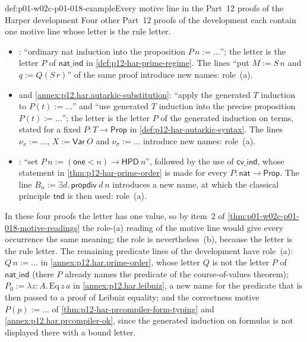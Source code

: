 \begin{hbexample}{def:p01-w02c-p01-018-example}{Every motive line in the Part~12 proofs of the Harper development}
Four other Part~12 proofs of the development each contain one motive line
whose letter is the rule letter.
\begin{itemize}
  \item {}: ``ordinary nat
  induction into the proposition \(P\,n:=\ldots\)''; the letter is the
  letter \(P\) of \(\mathsf{nat\_ind}\) in
  \cref{def:p12-har-prime-regime}.  The lines ``put \(M:=S\,n\) and
  \(q:=Q(S\,r)\)'' of the same proof introduce new names: role~(a).
  \item {} and
  \cref{annex:p12.har.autarkic-substitution}: ``apply the generated
  \(T\) induction to \(P(t):=\ldots\)'' and ``use generated \(T\)
  induction into the precise proposition \(P(t):=\ldots\)''; the letter is
  the letter \(P\) of the generated induction on terms, stated for a fixed
  \(P:T\to\mathsf{Prop}\) in \cref{def:p12-har-autarkic-syntax}.
  The lines \(\nu_x:=\ldots\), \(X:=\mathsf{Var}\ O\) and
  \(\nu_\sigma:=\ldots\) introduce new names: role~(a).
  \item {}: ``set
  \(P\,n:=(\mathsf{one}<n)\to\mathsf{HPD}\ n\)'', followed by the use of
  \(\mathsf{cv\_ind}\), whose statement in
  \cref{thm:p12-har-prime-order} is made for every
  \(P:\mathsf{nat}\to\mathsf{Prop}\).  The line
  \(B_n:=\exists d.\,\mathsf{propdiv}\ d\ n\) introduces a new name, at
  which the classical principle \(\mathsf{tnd}\) is then used: role~(a).
\end{itemize}
In these four proofs the letter has one value, so by item~2 of
\cref{thm:p01-w02c-p01-018-motive-readings} the role-(a) reading of the
motive line would give every occurrence the same meaning; the role is
nevertheless~(b), because the letter is the rule letter.  The remaining
predicate lines of the development have role~(a): \(Q\,n:=\ldots\) in
\cref{annex:p12.har.prime-order}, whose letter \(Q\) is not the letter
\(P\) of \(\mathsf{nat\_ind}\) (there \(P\) already names the predicate of
the course-of-values theorem); \(P_0:=\lambda z{:}A.\,\mathrm{Eq}\,z\,a\)
in \cref{annex:p12.har.leibniz}, a new name for the predicate that is
then passed to a proof of Leibniz equality; and the correctness motive
\(P(p):=\ldots\) of \cref{thm:p12-har-prcompiler-form-typing} and
\cref{annex:p12.har.prcompiler-ok}, since the generated induction on
formulas is not displayed there with a bound letter.
\end{hbexample}

